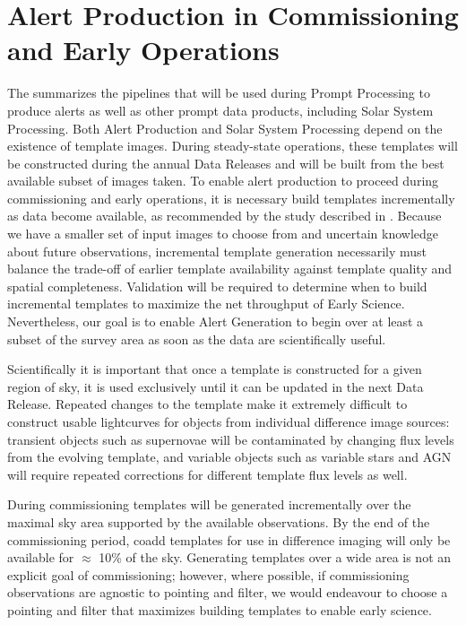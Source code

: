 
%


\section{Alert Production in Commissioning and Early Operations}
\label{sec:pp}

The \DPDD{} summarizes the pipelines that will be used during Prompt Processing to produce alerts as well as other prompt data products, including Solar System Processing.
Both Alert Production and Solar System Processing depend on the existence of template images.
During steady-state operations, these templates will be constructed during the annual Data Releases and will be built from the best available subset of images taken.
To enable alert production to proceed during commissioning and early operations, it is necessary build templates incrementally as data become available, as recommended by the study described in .
Because we have a smaller set of input images to choose from and uncertain knowledge about future observations, incremental template generation necessarily must balance the trade-off of earlier template availability against template quality and spatial completeness.
Validation will be required to determine when to build incremental templates to maximize the net throughput of Early Science.
Nevertheless, our goal is to enable Alert Generation to begin over at least a subset of the survey area as soon as the data are scientifically useful.

Scientifically it is important that once a template is constructed for a given region of sky, it is used exclusively until it can be updated in the next Data Release.
Repeated changes to the template make it extremely difficult to construct usable lightcurves for objects from individual difference image sources: transient objects such as supernovae will be contaminated by changing flux levels from the evolving template, and variable objects such as variable stars and AGN will require repeated corrections for different template flux levels as well.

During commissioning templates will be generated incrementally over the maximal sky area supported by the available observations.
By the end of the commissioning period, coadd templates for use in difference imaging will only be available for $\approx$ 10\% of the sky.
Generating templates over a wide area is not an explicit goal of commissioning;  however, where possible, if commissioning observations are agnostic to pointing and filter, we would endeavour to choose a pointing and filter that maximizes building templates to enable early science.

